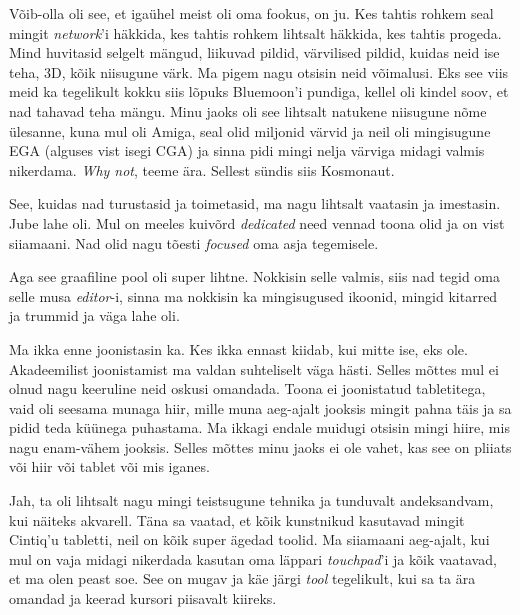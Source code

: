 Võib-olla oli see, et igaühel meist oli oma fookus, on ju. Kes tahtis rohkem seal mingit \emph{network}'i häkkida, kes tahtis rohkem lihtsalt häkkida, kes tahtis progeda. Mind huvitasid selgelt mängud, liikuvad pildid, värvilised pildid, kuidas neid ise teha, 3D, kõik niisugune värk. Ma pigem nagu otsisin neid võimalusi. Eks see viis meid ka tegelikult kokku siis lõpuks Bluemoon'i pundiga, kellel oli  kindel soov, et nad tahavad teha mängu. Minu jaoks oli see lihtsalt natukene niisugune nõme ülesanne, kuna mul oli Amiga, seal olid miljonid värvid ja neil oli mingisugune EGA (alguses vist isegi CGA) ja sinna pidi mingi nelja värviga midagi valmis nikerdama. \emph{Why not}, teeme ära. Sellest sündis siis Kosmonaut. 

See, kuidas nad turustasid ja toimetasid, ma nagu lihtsalt vaatasin ja imestasin. Jube lahe oli. Mul on meeles kuivõrd \emph{dedicated} need vennad toona olid ja on vist siiamaani. Nad olid nagu tõesti  \emph{focused} oma asja tegemisele. 

Aga see graafiline pool oli super lihtne. Nokkisin selle valmis, siis nad tegid oma selle musa \emph{editor}-i, sinna ma nokkisin ka mingisugused ikoonid, mingid kitarred ja  trummid ja väga lahe oli.


Ma ikka enne joonistasin ka. Kes ikka ennast kiidab, kui mitte ise, eks ole. Akadeemilist joonistamist ma valdan  suhteliselt väga hästi. Selles mõttes mul ei olnud nagu keeruline neid oskusi omandada. Toona ei joonistatud tabletitega, vaid oli seesama munaga hiir, mille muna aeg-ajalt jooksis mingit pahna täis ja sa pidid teda küünega puhastama. Ma ikkagi endale muidugi otsisin mingi hiire, mis nagu enam-vähem jooksis. Selles mõttes minu jaoks ei ole vahet, kas see on pliiats või hiir või tablet või mis iganes. 


Jah, ta oli lihtsalt nagu mingi teistsugune tehnika ja tunduvalt andeksandvam, kui näiteks akvarell. Täna sa vaatad, et  kõik kunstnikud kasutavad mingit Cintiq'u tabletti, neil on kõik super ägedad toolid. Ma siiamaani aeg-ajalt, kui mul on vaja midagi nikerdada kasutan oma läppari \emph{touchpad}'i ja kõik vaatavad, et ma olen peast soe. See on mugav ja käe järgi \emph{tool} tegelikult, kui sa ta ära omandad ja keerad kursori piisavalt kiireks.

